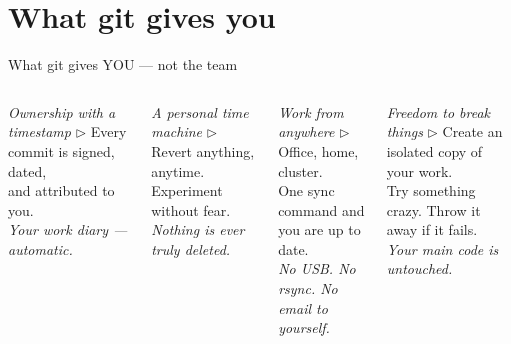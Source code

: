 \documentclass[aspectratio=169]{beamer}
\begin{document}
\section{What git gives you}

\begin{frame}{What git gives YOU --- not the team}
    \begin{columns}
            \begin{block}{\emph{Ownership with a timestamp} $\triangleright$}
                Every commit is signed, dated,\\
                and attributed to you.\\[4pt]
                \textit{Your work diary --- automatic.}
            \end{block}
            \vspace{0.5em}
            \begin{block}{\emph{A personal time machine} $\triangleright$}
                Revert anything, anytime.\\
                Experiment without fear.\\[4pt]
                \textit{Nothing is ever truly deleted.}
            \end{block}
            \begin{block}{\emph{Work from anywhere} $\triangleright$}
                Office, home, cluster.\\
                One sync command and you are up to date.\\[4pt]
                \textit{No USB. No rsync. No email to yourself.}
            \end{block}
            \vspace{0.5em}
            \begin{block}{\emph{Freedom to break things} $\triangleright$}
                Create an isolated copy of your work.\\
                Try something crazy. Throw it away if it fails.\\[4pt]
                \textit{Your main code is untouched.}
            \end{block}
    \end{columns}
\end{frame}

\end{document}
